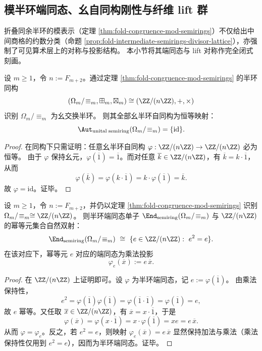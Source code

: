 \subsection{模半环端同态、幺自同构刚性与纤维 lift 群}\label{subsec:fold-mod-semirings-endomorphisms-and-lifts}
折叠同余半环的模表示（定理 \ref{thm:fold-congruence-mod-semirings}）不仅给出中间商格的约数分类（命题 \ref{prop:fold-intermediate-semirings-divisor-lattice}），亦强制了可见算术层上的对称与投影结构。
本小节将其端同态与 lift 对称作完全闭式刻画。

\begin{theorem}[折叠同余半环的幺自同构刚性]\label{thm:fold-mod-semirings-unital-automorphism-rigidity}
设 \(m\ge 1\)，令 \(n:=F_{m+2}\)。通过定理 \ref{thm:fold-congruence-mod-semirings} 的半环同构
\[
(\Omega_m/\!\equiv_m,\boxplus_m,\boxtimes_m)\cong (\ZZ/(n\ZZ),+,\times)
\]
识别 \(\Omega_m/\!\equiv_m\) 为幺交换半环。
则其全部幺半环自同构为恒等映射：
\[
\Aut_{\mathrm{unital\; semiring}}(\Omega_m/\!\equiv_m)=\{\mathrm{id}\}.
\]
\end{theorem}
\begin{proof}
在同构下只需证明：任意幺半环自同构 \(\varphi:\ZZ/(n\ZZ)\to \ZZ/(n\ZZ)\) 必为恒等。
由于 \(\varphi\) 保持幺元，\(\varphi(\overline 1)=\overline 1\)。而对任意 \(\overline k\in\ZZ/(n\ZZ)\)，有 \(\overline k=k\cdot \overline 1\)，从而
\[
\varphi(\overline k)=\varphi(k\cdot \overline 1)=k\cdot \varphi(\overline 1)=\overline k.
\]
故 \(\varphi=\mathrm{id}\)。证毕。
\end{proof}

\begin{theorem}[折叠同余半环的端同态与幂等元分类]\label{thm:fold-mod-semirings-endomorphisms-idempotents}
设 \(m\ge 1\)，令 \(n:=F_{m+2}\)，并仍以定理 \ref{thm:fold-congruence-mod-semirings} 识别 \(\Omega_m/\!\equiv_m\cong \ZZ/(n\ZZ)\)。
则半环端同态单子 \(\End_{\mathrm{semiring}}(\Omega_m/\!\equiv_m)\) 与 \(\ZZ/(n\ZZ)\) 的幂等元集合自然双射：
\[
\End_{\mathrm{semiring}}(\Omega_m/\!\equiv_m)\ \cong\ \{e\in \ZZ/(n\ZZ):\ e^2=e\}.
\]
在该对应下，幂等元 \(e\) 对应的端同态为乘法投影
\[
\varphi_e(\overline x):=e\,\overline x.
\]
\end{theorem}
\begin{proof}
在 \(\ZZ/(n\ZZ)\) 上证明即可。设 \(\varphi\) 为半环端同态，记 \(e:=\varphi(\overline 1)\)。
由乘法保持性，
\[
e^2=\varphi(\overline 1)\varphi(\overline 1)=\varphi(\overline 1\cdot \overline 1)=\varphi(\overline 1)=e,
\]
故 \(e\) 幂等。又任取 \(\overline x\in\ZZ/(n\ZZ)\)，有 \(\overline x=x\cdot \overline 1\)，于是
\[
\varphi(\overline x)=\varphi(x\cdot \overline 1)=x\cdot \varphi(\overline 1)=x e=e\,\overline x.
\]
从而 \(\varphi=\varphi_e\)。反之，若 \(e^2=e\)，则映射 \(\varphi_e(\overline x)=e\,\overline x\) 显然保持加法与乘法（乘法保持性仅用到 \(e^2=e\)），因而为半环端同态。证毕。
\end{proof}

